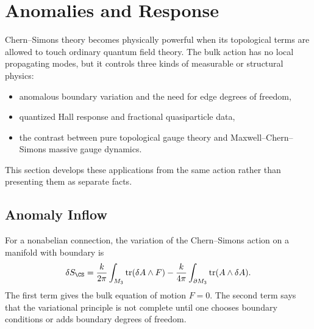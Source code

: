 
\providecommand{\dd}{\mathrm{d}}
\providecommand{\U}{\operatorname{U}}
\providecommand{\Tr}{\operatorname{Tr}}
\providecommand{\tr}{\operatorname{tr}}
\providecommand{\Lk}{\operatorname{Lk}}

\section{Anomalies and Response}
\label{sec:anomalies-boundaries-response}

Chern--Simons theory becomes physically powerful when its topological terms are allowed to touch ordinary quantum field theory. The bulk action has no local propagating modes, but it controls three kinds of measurable or structural physics:
\begin{itemize}
  \item anomalous boundary variation and the need for edge degrees of freedom,
  \item quantized Hall response and fractional quasiparticle data,
  \item the contrast between pure topological gauge theory and Maxwell--Chern--Simons massive gauge dynamics.
\end{itemize}
This section develops these applications from the same action rather than presenting them as separate facts.


\subsection{Anomaly Inflow}
\label{subsec:boundary-variation-inflow}

For a nonabelian connection, the variation of the Chern--Simons action on a manifold with boundary is
\begin{equation}
  \delta S_{\CS}
  =
  \frac{k}{2\pi}\int_{M_3}\tr(\delta A\wedge F)
  -
  \frac{k}{4\pi}\int_{\partial M_3}\tr(A\wedge\delta A).
  \label{eq:anomaly-cs-variation-boundary}
\end{equation}
The first term gives the bulk equation of motion $F=0$. The second term says that the variational principle is not complete until one chooses boundary conditions or adds boundary degrees of freedom.

